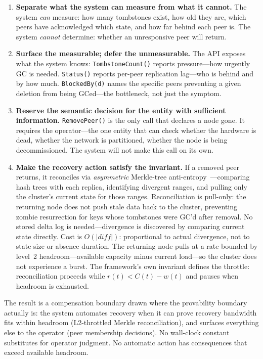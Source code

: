 \documentclass[11pt]{article}
\begin{document}
\begin{enumerate}
  \item \textbf{Separate what the system can measure from what it cannot.} The
    system \emph{can} measure: how many tombstones exist, how old they are,
    which peers have acknowledged which state, and how far behind each peer is.
    The system \emph{cannot} determine: whether an unresponsive peer will return.

  \item \textbf{Surface the measurable; defer the unmeasurable.} The API exposes
    what the system knows: \texttt{TombstoneCount()} reports pressure---how
    urgently GC is needed. \texttt{Status()} reports per-peer replication
    lag---who is behind and by how much. \texttt{BlockedBy(d)} names the specific
    peers preventing a given deletion from being GCed---the bottleneck, not just
    the symptom.

  \item \textbf{Reserve the semantic decision for the entity with sufficient
    information.} \texttt{Remove\-Peer()} is the only call that declares a node
    gone. It requires the operator---the one entity that can check whether the
    hardware is dead, whether the network is partitioned, whether the node is
    being decommissioned. The system will not make this call on its own.

  \item \textbf{Make the recovery action satisfy the invariant.} If a removed
    peer returns, it reconciles via \emph{asymmetric} Merkle-tree
    anti-entropy~\cite{decandia2007dynamo}---comparing hash trees with each
    replica, identifying divergent ranges, and pulling only the cluster's
    current state for those ranges. Reconciliation is pull-only: the returning
    node does not push stale data back to the cluster, preventing zombie
    resurrection for keys whose tombstones were GC'd after removal. No stored
    delta log is needed---divergence is discovered by comparing current state
    directly. Cost is $O(|\mathit{diff}|)$: proportional to actual divergence,
    not to state size or absence duration. The returning node pulls at a rate
    bounded by level~2 headroom---available capacity minus current load---so
    the cluster does not experience a burst. The framework's own invariant
    defines the throttle: reconciliation proceeds while $r(t) < C(t) - w(t)$
    and pauses when headroom is exhausted.
\end{enumerate}

The result is a compensation boundary drawn where the provability boundary
actually is: the system automates recovery when it can prove recovery bandwidth
fits within headroom (L2-throttled Merkle reconciliation), and surfaces
everything else to the operator (peer membership decisions). No wall-clock
constant substitutes for operator judgment. No automatic action has consequences
that exceed available headroom.
\end{document}

